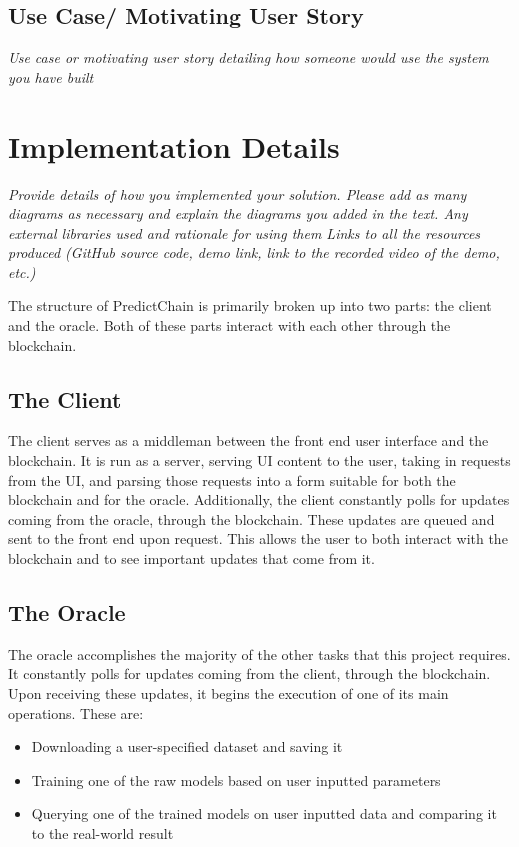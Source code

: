 \documentclass{article}
\begin{document}
\subsection{Use Case/ Motivating User Story}
\emph{Use case or motivating user story detailing how someone would use the system you have built}

\section{Implementation Details}

\emph{Provide details of how you implemented your solution. Please add as many diagrams as necessary and explain the
diagrams you added in the text.
Any external libraries used and rationale for using them
Links to all the resources produced (GitHub source code, demo link, link to the recorded video of the demo, etc.)}

The structure of PredictChain is primarily broken up into two parts: the client and the oracle.  Both of these parts interact
with each other through the blockchain.

\subsection{The Client}

The client serves as a middleman between the front end user interface and the
blockchain.  It is run as a server, serving UI content to the user, taking in requests from the UI, and parsing those
requests into a form suitable for both the blockchain and for the oracle.  Additionally, the client constantly polls
for updates coming from the oracle, through the blockchain.  These updates are queued and sent to the front end upon request.
This allows the user to both interact with the blockchain and to see important updates that come from it.

\subsection{The Oracle}

The oracle accomplishes the majority of the other tasks that this project requires.  It constantly polls for updates
coming from the client, through the blockchain.  Upon receiving these updates, it begins the execution of one of its
main operations.  These are:

\begin{itemize}
    \item Downloading a user-specified dataset and saving it
    \item Training one of the raw models based on user inputted parameters
    \item Querying one of the trained models on user inputted data and comparing it to the real-world result
\end{itemize}
\end{document}
